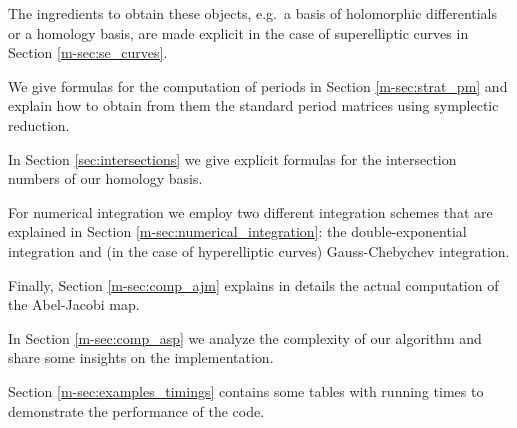 \documentclass[main.tex]{subfiles}
\begin{document}
  The ingredients to obtain these objects, e.g.\ a basis of holomorphic differentials or a homology basis, are made explicit in the case of superelliptic curves in Section \ref{m-sec:se_curves}.
  
  We give formulas for the computation of periods in Section \ref{m-sec:strat_pm} and explain how to obtain from them the standard period matrices using symplectic reduction.
  
  In Section \ref{sec:intersections} we give explicit formulas for the intersection numbers of our homology basis.
  
  For numerical integration we employ two different integration schemes that are explained in Section \ref{m-sec:numerical_integration}: the double-exponential integration and
  (in the case of hyperelliptic curves) Gauss-Chebychev integration.
  
  Finally, Section \ref{m-sec:comp_ajm} explains in details the actual computation of the Abel-Jacobi map.
  
  In Section \ref{m-sec:comp_asp} we analyze the complexity of our algorithm and share some insights on the implementation.
  
  Section \ref{m-sec:examples_timings} contains some tables with running times to demonstrate the performance of the code.
 
 
\end{document}

